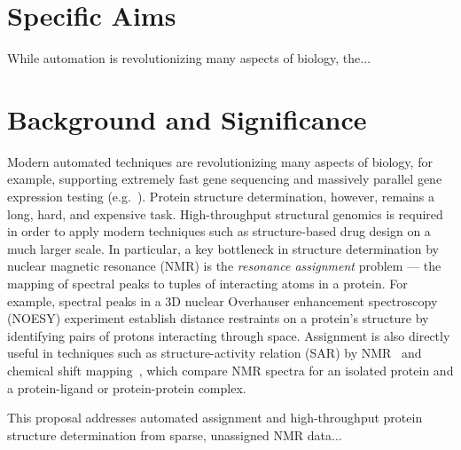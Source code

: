 \documentclass[12pt]{article}%
\def\mydate{02/11/13 11:42:14 brd}
\begin{document}
\bigskip

\appendix 


\setcounter{page}{20} %


\medskip 



\section{Specific Aims}

While automation is revolutionizing many aspects of biology, the$\ldots$

\section{Background and Significance}\label{sec:background}


Modern automated techniques are revolutionizing many aspects of
biology, for example, supporting extremely fast gene sequencing and
massively parallel gene expression testing
(e.g.~\cite{chen99,hartuv99,karp99}).  Protein structure
determination, however, remains a long, hard, and expensive task.
High-throughput structural genomics is required in order to apply
modern techniques such as structure-based drug design on a much larger
scale.  In particular, a key bottleneck in structure determination by
nuclear magnetic resonance (NMR) is the {\em resonance assignment}
problem --- the mapping of spectral peaks to tuples of interacting
atoms in a protein.  For example, spectral peaks in a 3D nuclear
Overhauser enhancement spectroscopy (NOESY) experiment establish
distance restraints on a protein's structure by identifying pairs of
protons interacting through space.  Assignment is also directly useful
in techniques such as structure-activity relation (SAR) by
NMR~\cite{shuker96,hajduk97} and chemical shift mapping~\cite{chen93},
which compare NMR spectra for an isolated protein and a protein-ligand
or protein-protein complex.

This proposal addresses automated assignment and high-throughput
protein structure determination from sparse, unassigned NMR data$\dots$
\end{document}
